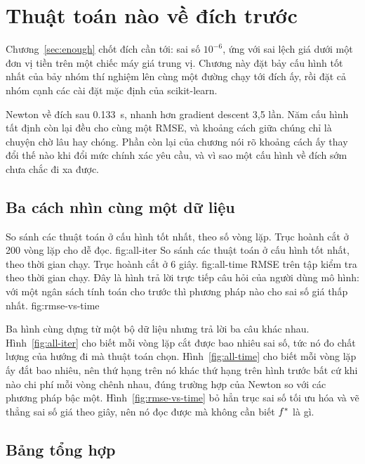 \chapter{Thuật toán nào về đích trước}
\label{sec:compare}

Chương~\ref{sec:enough} chốt đích cần tới: sai số $10^{-6}$, ứng với sai lệch
giá dưới một đơn vị tiền trên một chiếc máy giá trung vị. Chương này đặt bảy cấu
hình tốt nhất của bảy nhóm thí nghiệm lên cùng một đường chạy tới đích ấy, rồi
đặt cả nhóm cạnh các cài đặt mặc định của scikit-learn.

Newton về đích sau \SI{0.133}{\second}, nhanh hơn
gradient descent 3,5 lần. Năm cấu hình tất định còn lại đều cho cùng một RMSE, và
khoảng cách giữa chúng chỉ là chuyện chờ lâu hay chóng. Phần còn lại của chương
nói rõ khoảng cách ấy thay đổi thế nào khi đổi mức chính xác yêu cầu, và vì sao
một cấu hình về đích sớm chưa chắc đi xa được.

\section{Ba cách nhìn cùng một dữ liệu}
\label{sec:compare-figures}

  {So sánh các thuật toán ở cấu hình tốt nhất, theo số vòng lặp. Trục hoành cắt
   ở 200 vòng lặp cho dễ đọc.}
  {fig:all-iter}
  {So sánh các thuật toán ở cấu hình tốt nhất, theo thời gian chạy. Trục hoành
   cắt ở 6 giây.}
  {fig:all-time}
  {RMSE trên tập kiểm tra theo thời gian chạy. Đây là hình trả lời trực tiếp câu
   hỏi của người dùng mô hình: với một ngân sách tính toán cho trước thì phương
   pháp nào cho sai số giá thấp nhất.}
  {fig:rmse-vs-time}

Ba hình cùng dựng từ một bộ dữ liệu nhưng trả lời ba câu khác nhau.
Hình~\ref{fig:all-iter} cho biết mỗi vòng lặp cắt được bao nhiêu sai số, tức nó
đo chất lượng của hướng đi mà thuật toán chọn. Hình~\ref{fig:all-time} cho biết
mỗi vòng lặp ấy đắt bao nhiêu, nên thứ hạng trên nó khác thứ hạng trên hình
trước bất cứ khi nào chi phí mỗi vòng chênh nhau, đúng trường hợp của Newton so
với các phương pháp bậc một. Hình~\ref{fig:rmse-vs-time} bỏ hẳn trục sai số tối
ưu hóa và vẽ thẳng sai số giá theo giây, nên nó đọc được mà không cần biết
$f^{*}$ là gì.

\section{Bảng tổng hợp}
\label{sec:compare-table}

